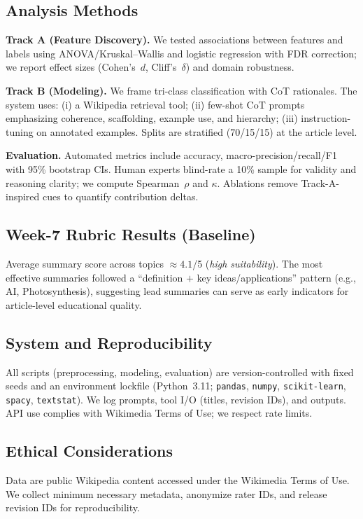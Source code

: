 \subsection{Analysis Methods}
\textbf{Track A (Feature Discovery).} We tested associations between features and labels using ANOVA/Kruskal–Wallis and logistic regression with FDR correction; we report effect sizes (Cohen’s~$d$, Cliff’s~$\delta$) and domain robustness.

\textbf{Track B (Modeling).} We frame tri-class classification with CoT rationales. The system uses: (i) a Wikipedia retrieval tool; (ii) few-shot CoT prompts emphasizing coherence, scaffolding, example use, and hierarchy; (iii) instruction-tuning on annotated examples. Splits are stratified (70/15/15) at the article level.

\textbf{Evaluation.} Automated metrics include accuracy, macro-precision/recall/F1 with 95\% bootstrap CIs. Human experts blind-rate a 10\% sample for validity and reasoning clarity; we compute Spearman~$\rho$ and $\kappa$. Ablations remove Track-A-inspired cues to quantify contribution deltas.

\subsection{Week-7 Rubric Results (Baseline)}
Average summary score across topics $\approx 4.1$/5 (\emph{high suitability}). The most effective summaries followed a “definition $+$ key ideas/applications” pattern (e.g., AI, Photosynthesis), suggesting lead summaries can serve as early indicators for article-level educational quality.

\subsection{System and Reproducibility}
All scripts (preprocessing, modeling, evaluation) are version-controlled with fixed seeds and an environment lockfile (Python~3.11; \texttt{pandas}, \texttt{numpy}, \texttt{scikit-learn}, \texttt{spacy}, \texttt{textstat}). We log prompts, tool I/O (titles, revision IDs), and outputs. API use complies with Wikimedia Terms of Use; we respect rate limits.

\subsection{Ethical Considerations}
Data are public Wikipedia content accessed under the Wikimedia Terms of Use. We collect minimum necessary metadata, anonymize rater IDs, and release revision IDs for reproducibility.
